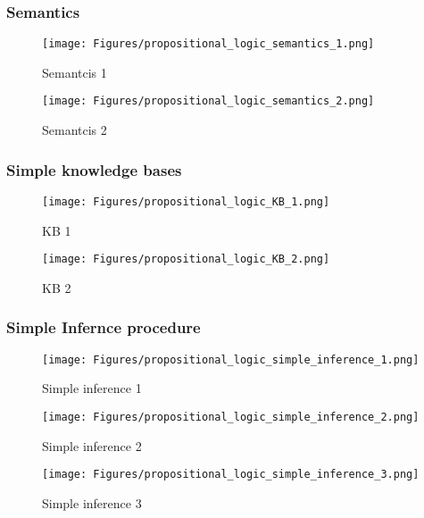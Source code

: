 \subsubsection{Semantics}

\begin{figure}[H]
    \centering
    \texttt{[image: Figures/propositional\_logic\_semantics\_1.png]}
    \caption{Semantcis 1}
    \label{fig:S1}
\end{figure}

\begin{figure}[H]
    \centering
    \texttt{[image: Figures/propositional\_logic\_semantics\_2.png]}
    \caption{Semantcis 2}
    \label{fig:S2}
\end{figure}

\subsubsection{Simple knowledge bases}

\begin{figure}[H]
    \centering
    \texttt{[image: Figures/propositional\_logic\_KB\_1.png]}
    \caption{KB 1}
    \label{fig:KB1}
\end{figure}


\begin{figure}[H]
    \centering
    \texttt{[image: Figures/propositional\_logic\_KB\_2.png]}
    \caption{KB 2}
    \label{fig:KB2}
\end{figure}


\subsubsection{Simple Infernce procedure}

\begin{figure}[H]
    \centering
    \texttt{[image: Figures/propositional\_logic\_simple\_inference\_1.png]}
    \caption{Simple inference 1}
    \label{fig:SI 1}
\end{figure}


\begin{figure}[H]
    \centering
    \texttt{[image: Figures/propositional\_logic\_simple\_inference\_2.png]}
    \caption{Simple inference 2}
    \label{fig:SI 2}
\end{figure}

\begin{figure}[H]
    \centering
    \texttt{[image: Figures/propositional\_logic\_simple\_inference\_3.png]}
    \caption{Simple inference 3}
    \label{fig:SI 3}
\end{figure}

